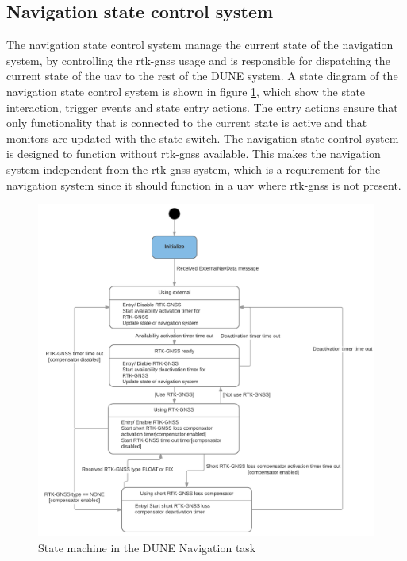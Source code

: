 \subsection{Navigation state control system}\label{S:NavState}
The navigation state control system manage the current state of the navigation system, by controlling the \gls{rtk-gnss} usage and is responsible for dispatching the current state of the \gls{uav} to the rest of the DUNE system. A state diagram of the navigation state control system is shown in figure \ref{Fig:NavState}, which show the state interaction, trigger events and state entry actions. The entry actions ensure that only functionality that is connected to the current state is active      and that monitors are updated with the state switch. The navigation state control system is designed to function without \gls{rtk-gnss} available. This makes the navigation system independent from the \gls{rtk-gnss} system, which is a requirement for the navigation system since it should function in a \gls{uav} where \gls{rtk-gnss} is not present.

\begin{figure}[H]
\includegraphics[scale=0.18]{figs/NavigationStateControl.png}
\caption{State machine in the DUNE Navigation task}
\label{Fig:NavState}
\end{figure}


